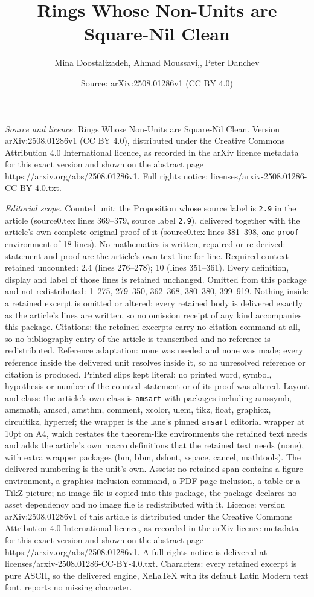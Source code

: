 \documentclass[10pt,a4paper]{amsart}
\title[Rings Whose Non-Units are Square-Nil Clean]{Rings Whose Non-Units are Square-Nil Clean}
\author{Mina Doostalizadeh, Ahmad Moussavi,, Peter Danchev}
\date{Source: arXiv:2508.01286v1 (CC BY 4.0)}
\begin{document}
\maketitle

\noindent\emph{Source and licence.} Rings Whose Non-Units are Square-Nil Clean. Version arXiv:2508.01286v1 (CC BY 4.0), distributed under the Creative Commons Attribution 4.0 International licence, as recorded in the arXiv licence metadata for this exact version and shown on the abstract page https://arxiv.org/abs/2508.01286v1. Full rights notice: licenses/arxiv-2508.01286-CC-BY-4.0.txt.\par\smallskip

\noindent\textit{Editorial scope.} Counted unit: the Proposition whose source label is \texttt{2.9} in the article (source0.tex lines 369--379, source label \texttt{2.9}), delivered together with the article's own complete original proof of it (source0.tex lines 381--398, one \texttt{proof} environment of 18 lines). No mathematics is written, repaired or re-derived: statement and proof are the article's own text line for line. Required context retained uncounted: 2.4 (lines 276--278); 10 (lines 351--361). Every definition, display and label of those lines is retained unchanged. Omitted from this package and not redistributed: 1--275, 279--350, 362--368, 380--380, 399--919. Nothing inside a retained excerpt is omitted or altered: every retained body is delivered exactly as the article's lines are written, so no omission receipt of any kind accompanies this package. Citations: the retained excerpts carry no citation command at all, so no bibliography entry of the article is transcribed and no reference is redistributed. Reference adaptation: none was needed and none was made; every reference inside the delivered unit resolves inside it, so no unresolved reference or citation is produced. Printed slips kept literal: no printed word, symbol, hypothesis or number of the counted statement or of its proof was altered. Layout and class: the article's own class is \texttt{amsart} with packages including amssymb, amsmath, amscd, amsthm, comment, xcolor, ulem, tikz, float, graphicx, circuitikz, hyperref; the wrapper is the lane's pinned \texttt{amsart} editorial wrapper at 10pt on A4, which restates the theorem-like environments the retained text needs and adds the article's own macro definitions that the retained text needs (none), with extra wrapper packages (bm, bbm, dsfont, xspace, cancel, mathtools). The delivered numbering is the unit's own. Assets: no retained span contains a figure environment, a graphics-inclusion command, a PDF-page inclusion, a table or a TikZ picture; no image file is copied into this package, the package declares no asset dependency and no image file is redistributed with it. Licence: version arXiv:2508.01286v1 of this article is distributed under the Creative Commons Attribution 4.0 International licence, as recorded in the arXiv licence metadata for this exact version and shown on the abstract page https://arxiv.org/abs/2508.01286v1. A full rights notice is delivered at licenses/arxiv-2508.01286-CC-BY-4.0.txt. Characters: every retained excerpt is pure ASCII, so the delivered engine, XeLaTeX with its default Latin Modern text font, reports no missing character.
\end{document}
